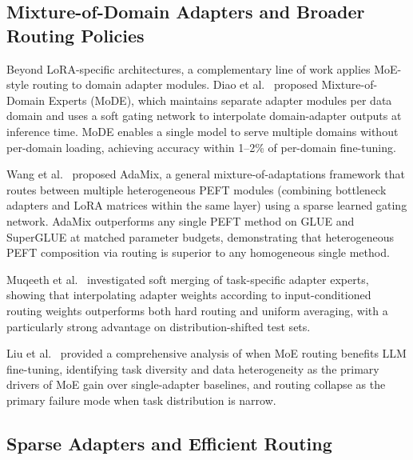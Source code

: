 \subsection{Mixture-of-Domain Adapters and Broader Routing Policies}
\label{sec:moe_routing:domain}

Beyond LoRA-specific architectures, a complementary line of work applies MoE-style
routing to domain adapter modules. Diao et al.~\cite{DiaomMoDE2023} proposed Mixture-of-Domain
Experts (MoDE), which maintains separate adapter modules per data domain and uses a
soft gating network to interpolate domain-adapter outputs at inference time. MoDE
enables a single model to serve multiple domains without per-domain loading, achieving
accuracy within 1--2\% of per-domain fine-tuning.

Wang et al.~\cite{WangAdaMix2022} proposed AdaMix, a general mixture-of-adaptations framework
that routes between multiple heterogeneous PEFT modules (combining bottleneck adapters
and LoRA matrices within the same layer) using a sparse learned gating network. AdaMix
outperforms any single PEFT method on GLUE and SuperGLUE at matched parameter budgets,
demonstrating that heterogeneous PEFT composition via routing is superior to any
homogeneous single method.

Muqeeth et al.~\cite{Muqeeth2024} investigated soft merging of task-specific adapter experts, showing
that interpolating adapter weights according to input-conditioned routing weights
outperforms both hard routing and uniform averaging, with a particularly strong
advantage on distribution-shifted test sets.

Liu et al.~\cite{LiuWhenMOE2024} provided a comprehensive analysis of when MoE routing benefits
LLM fine-tuning, identifying task diversity and data heterogeneity as the primary
drivers of MoE gain over single-adapter baselines, and routing collapse as the primary
failure mode when task distribution is narrow.

\subsection{Sparse Adapters and Efficient Routing}
\label{sec:moe_routing:sparse}

